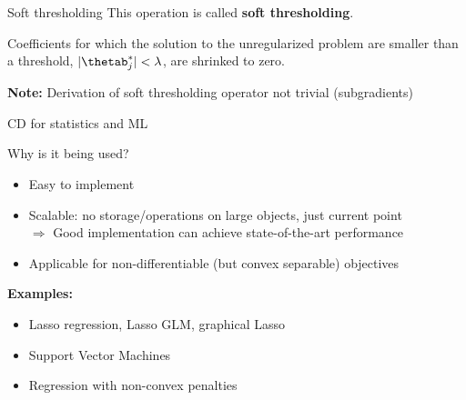 \documentclass[11pt,compress,t,notes=noshow, xcolor=table]{beamer}
\begin{document}
\begin{vbframe}{Soft thresholding}
This operation is called \textbf{soft thresholding}.

\medskip

Coefficients for which the solution to the unregularized problem are smaller than a threshold, $|\thetab^\ast_j| < \lambda$, are shrinked to zero. 

\medskip


\textbf{Note:} Derivation of soft thresholding operator not trivial (subgradients)

\end{vbframe}


\begin{vbframe}{CD for statistics and ML}

Why is it being used?

\begin{itemize}
\item Easy to implement
\item Scalable: no storage/operations on large objects,
  just current point \\
    $\Rightarrow$ Good implementation can achieve state-of-the-art performance
\item Applicable for non-differentiable (but convex separable) objectives
\end{itemize}

\medskip

\textbf{Examples:}
\begin{itemize}
\item Lasso regression, Lasso GLM, graphical Lasso
\item Support Vector Machines
\item Regression with non-convex penalties
\end{itemize}




\end{vbframe}


\endlecture
\end{document}
